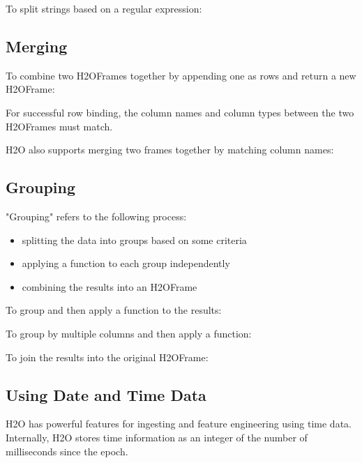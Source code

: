 {\newpage
To split strings based on a regular expression:



\subsection{Merging}
To combine two H2OFrames together by appending one as rows and return a new H2OFrame:


For successful row binding, the column names and column types between the two H2OFrames must match.

H2O also supports merging two frames together by matching column names:


\subsection{Grouping}

"Grouping" refers to the following process:

\begin{itemize}
\item splitting the data into groups based on some criteria 
\item applying a function to each group independently
\item combining the results into an H2OFrame
\end{itemize}

To group and then apply a function to the results:


To group by multiple columns and then apply a function:


To join the results into the original H2OFrame:


\newpage
\subsection{Using Date and Time Data} 
H2O has powerful features for ingesting and feature engineering using time data.  Internally, H2O
stores time information as an integer of the number of milliseconds since the epoch.

}
